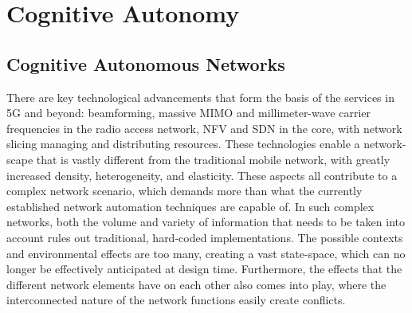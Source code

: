 	\section{Cognitive Autonomy}
	
		\subsection{Cognitive Autonomous Networks}
		
			There are key technological advancements that form the basis of the services in \ac{5G} and beyond: beamforming, massive \ac{MIMO} and millimeter-wave carrier frequencies in the radio access network, \ac{NFV} and \ac{SDN} in the core, with network slicing managing and distributing resources.	
			These technologies enable a network-scape that is vastly different from the traditional mobile network, with greatly increased density, heterogeneity, and elasticity.
			These aspects all contribute to a complex network scenario, which demands more than what the currently established network automation techniques are capable of.			
			In such complex networks, both the volume and variety of information that needs to be taken into account rules out traditional, hard-coded implementations.
			The possible contexts and environmental effects are too many, creating a vast state-space, which can no longer be effectively anticipated at design time.
			Furthermore, the effects that the different network elements have on each other also comes into play, where the interconnected nature of the network functions easily create conflicts.
			
